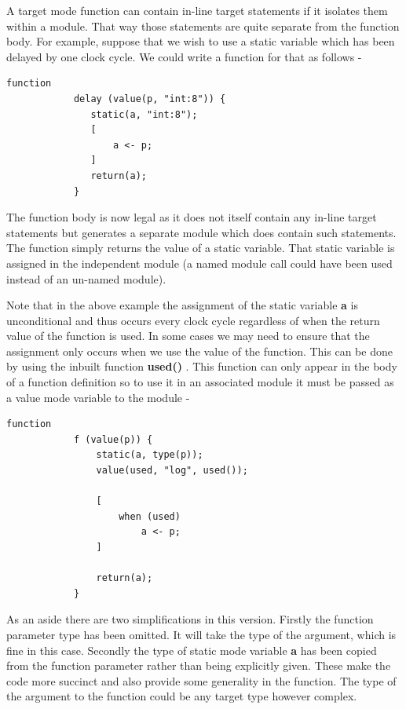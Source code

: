         A target mode function can contain in-line target statements if
        it isolates them within a module. That way those statements are
        quite separate from the function body.
        For example, suppose that we wish to use a static variable which has been
        delayed by one clock cycle. We could write a function for that as
        follows -
        
        \begin{lstlisting}[gobble=8, language=threepl]
            function
            delay (value(p, "int:8")) {
               static(a, "int:8");
               [
                   a <- p;
               ]
               return(a);
            }
        \end{lstlisting}
        The function body is now legal as it does not itself contain any in-line
        target statements but generates a separate module which does contain
        such statements. The function simply returns the value of a static
        variable. That static variable is assigned in the independent module
        (a named module call could have been used instead of an un-named module).
        
        Note that in the above example the assignment of the static variable {\bf
        a} is unconditional and thus occurs every clock cycle regardless of when
        the return value of the function is used. In some cases we may need to
        ensure that the assignment only occurs when we use the value of the
        function. This can be done by using the inbuilt function {\bf used()}
        . This function can only appear in the body
        of a function definition so to use it in an associated module it must
        be passed as a value mode variable to the module -
        
        \begin{lstlisting}[gobble=8, language=threepl]
            function
            f (value(p)) {
                static(a, type(p));
                value(used, "log", used());

                [
                    when (used)
                        a <- p;
                ]

                return(a);
            }
        \end{lstlisting}
        
        As an aside there are two simplifications in this version. Firstly
        the function parameter type has been omitted. It will take the type of
        the argument, which is fine in this case. Secondly the type of static
        mode variable {\bf a} has been copied from the function parameter rather
        than being explicitly given. These make the code more succinct and also
        provide some generality in the function. The type of the argument to
        the function could be any target type however complex.
        
